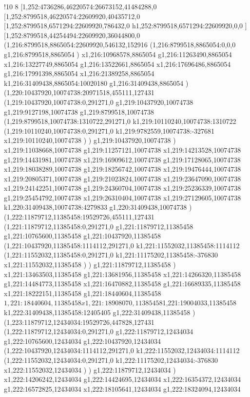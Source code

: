 !10
{8
[1,252:4736286,46220574:26673152,41484288,0
[1,252:8799518,46220574:22609920,40435712,0
[1,252:8799518,6571294:22609920,786432,0
h1,252:8799518,6571294:22609920,0,0
]
[1,252:8799518,44254494:22609920,36044800,0
(1,216:8799518,8865054:22609920,546132,152916
(1,216:8799518,8865054:0,0,0
g1,216:8799518,8865054
)
x1,216:10968578,8865054
g1,216:11263490,8865054
x1,216:13227749,8865054
g1,216:13522661,8865054
x1,216:17696486,8865054
g1,216:17991398,8865054
x1,216:21389258,8865054
k1,216:31409438,8865054:10020180
g1,216:31409438,8865054
)
(1,220:10437920,10074738:20971518,455111,127431
(1,219:10437920,10074738:0,291271,0
g1,219:10437920,10074738
g1,219:9127198,10074738
g1,219:8799518,10074738
(1,219:8799518,10074738:1310722,291271,0
k1,219:10110240,10074738:1310722
(1,219:10110240,10074738:0,291271,0
k1,219:9782559,10074738:-327681
x1,219:10110240,10074738
)
)
g1,219:10437920,10074738
)
x1,219:11038668,10074738
g1,219:11257121,10074738
x1,219:14213528,10074738
g1,219:14431981,10074738
x1,219:16909612,10074738
g1,219:17128065,10074738
x1,219:18038289,10074738
g1,219:18256742,10074738
x1,219:19476444,10074738
x1,219:20805371,10074738
g1,219:21023824,10074738
x1,219:23647090,10074738
x1,219:24142251,10074738
g1,219:24360704,10074738
x1,219:25236339,10074738
g1,219:25454792,10074738
x1,219:26310404,10074738
x1,219:27129605,10074738
k1,220:31409438,10074738:4279833
g1,220:31409438,10074738
)
(1,222:11879712,11385458:19529726,455111,127431
(1,221:11879712,11385458:0,291271,0
g1,221:11879712,11385458
g1,221:10765600,11385458
g1,221:10437920,11385458
(1,221:10437920,11385458:1114112,291271,0
k1,221:11552032,11385458:1114112
(1,221:11552032,11385458:0,291271,0
k1,221:11175202,11385458:-376830
x1,221:11552032,11385458
)
)
g1,221:11879712,11385458
)
x1,221:13463503,11385458
g1,221:13681956,11385458
x1,221:14266320,11385458
g1,221:14484773,11385458
x1,221:16470882,11385458
g1,221:16689335,11385458
x1,221:18222151,11385458
g1,221:18440604,11385458
$1,221:18440604,11385458
x1,221:18908070,11385458
$1,221:19004033,11385458
k1,222:31409438,11385458:12405405
g1,222:31409438,11385458
)
(1,223:11879712,12434034:19529726,447828,127431
(1,222:11879712,12434034:0,291271,0
g1,222:11879712,12434034
g1,222:10765600,12434034
g1,222:10437920,12434034
(1,222:10437920,12434034:1114112,291271,0
k1,222:11552032,12434034:1114112
(1,222:11552032,12434034:0,291271,0
k1,222:11175202,12434034:-376830
x1,222:11552032,12434034
)
)
g1,222:11879712,12434034
)
x1,222:14206242,12434034
g1,222:14424695,12434034
x1,222:16354372,12434034
g1,222:16572825,12434034
x1,222:18105641,12434034
g1,222:18324094,12434034
}

